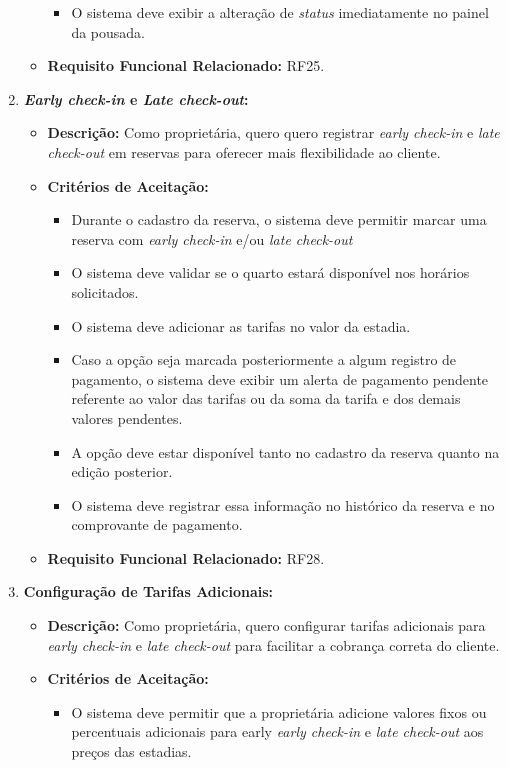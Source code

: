 \documentclass[
	12pt,				%
	openany,			%
	twoside,			%
	a4paper,			%
	english,			%
	french,				%
	spanish,			%
	brazil				%
	]{abntex2}
\begin{document}
\begin{enumerate}[label=\textbf{\arabic*.}]
\begin{itemize}
\begin{itemize}
	 		\item O sistema deve exibir a alteração de \textit{status} imediatamente no painel da pousada.
	 	\end{itemize}
	 	\item \textbf{Requisito Funcional Relacionado:} RF25.
	 \end{itemize} 
	  \item \textbf{\textit{Early check-in} e \textit{Late check-out}:}
	 \begin{itemize}
	 	\item \textbf{Descrição:}  Como proprietária, quero quero registrar \textit{early check-in} e \textit{late check-out} em reservas para oferecer mais flexibilidade ao cliente.
	 	\item \textbf{Critérios de Aceitação:}
	 	\begin{itemize}
	 		\item Durante o cadastro da reserva, o sistema deve permitir marcar uma reserva com \textit{early check-in} e/ou \textit{late check-out}
	 		\item O sistema deve validar se o quarto estará disponível nos horários solicitados.
	 		\item O sistema deve adicionar as tarifas no valor da estadia.
	 		\item Caso a opção seja marcada posteriormente a algum registro de pagamento, o sistema deve exibir um alerta de pagamento pendente referente ao valor das tarifas ou da soma da tarifa e dos demais valores pendentes.
	 		\item A opção deve estar disponível tanto no cadastro da reserva quanto na edição posterior.
	 		\item O sistema deve registrar essa informação no histórico da reserva e no comprovante de pagamento.
	 	\end{itemize}
	 	\item \textbf{Requisito Funcional Relacionado:} RF28.
	 \end{itemize} 
	  \item \textbf{Configuração de Tarifas Adicionais:}
	 \begin{itemize}
	 	\item \textbf{Descrição:} Como proprietária, quero configurar tarifas adicionais para \textit{early check-in} e \textit{late check-out} para facilitar a cobrança correta do cliente.
	 	\item \textbf{Critérios de Aceitação:}
	 	\begin{itemize}
	 		\item O sistema deve permitir que a proprietária adicione valores fixos ou percentuais adicionais para early \textit{early check-in} e \textit{late check-out} aos preços das estadias.

\end{itemize}
\end{itemize}
\end{enumerate}
\end{document}
